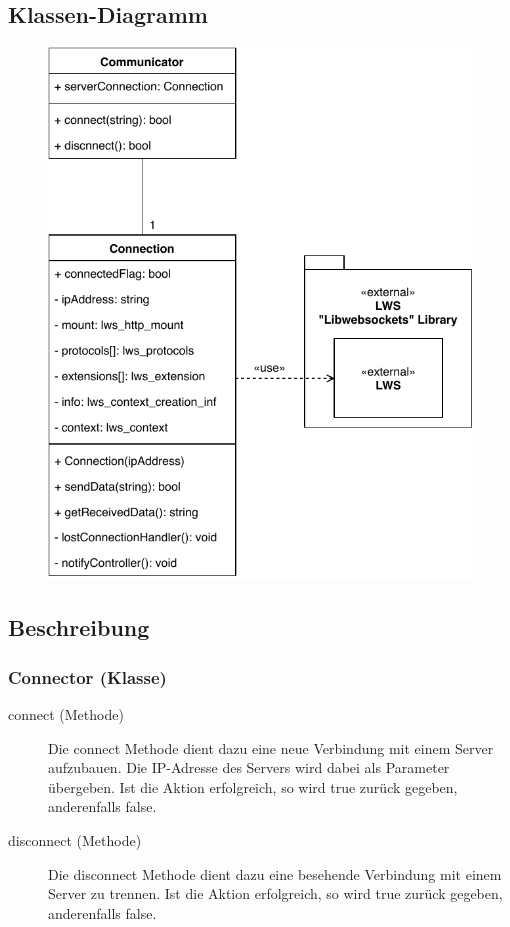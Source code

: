 \subsection{Klassen-Diagramm}

    \begin{figure}[H]
        \centering
        \includegraphics[scale=1]{images/Kommunikator.pdf}
    \end{figure}

\subsection{Beschreibung}
	\subsubsection{Connector (Klasse)}
	
		\begin{description}
                
        	\item[connect (Methode)]
        	Die connect Methode dient dazu eine neue Verbindung mit einem Server aufzubauen. Die IP-Adresse des Servers wird dabei als Parameter übergeben. Ist die Aktion erfolgreich, so wird true zurück gegeben, anderenfalls false.
			
			\item[disconnect (Methode)]
        	Die disconnect Methode dient dazu eine besehende Verbindung mit einem Server zu trennen. Ist die Aktion erfolgreich, so wird true zurück gegeben, anderenfalls false.
        	
    	\end{description}
	
